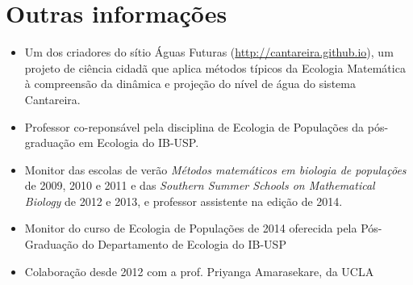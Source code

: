 \documentclass[a4paper ,11pt]{article}
\begin{document}
\section{Outras informações}
\begin{itemize}
    \item Um dos criadores do sítio Águas Futuras
        (\url{http://cantareira.github.io}), um projeto de ciência cidadã que
        aplica métodos típicos da Ecologia Matemática à compreensão da
        dinâmica e projeção do nível de água do sistema Cantareira.
    \item Professor co-reponsável pela disciplina de Ecologia de Populações da
pós-graduação em Ecologia do IB-USP.
    \item Monitor das escolas de verão \emph{Métodos matemáticos em biologia de
populações} de 2009, 2010 e 2011 e das \emph{Southern Summer Schools on Mathematical
Biology} de 2012 e 2013, e professor assistente na edição de 2014.
    \item Monitor do curso de Ecologia de Populações de 2014 oferecida pela Pós-Graduação do Departamento de
Ecologia do IB-USP
    \item Colaboração desde 2012 com a prof. Priyanga Amarasekare, da UCLA
\end{itemize}
\end{document}

